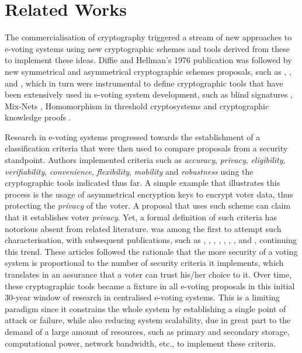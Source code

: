 \documentclass[../main.tex]{subfiles}
\begin{document}
\section{Related Works}
\label{sec:related_works}
The commercialisation of cryptography triggered a stream of new approaches to e-voting systems using new cryptographic schemes and tools derived from these to implement these ideas. Diffie and Hellman's 1976 publication \cite{Diffie1976} was followed by new symmetrical and asymmetrical cryptographic schemes proposals, such as \cite{Chaum1981}, \cite{ElGamal1984}, and \cite{Rivest1983}, which in turn were instrumental to define cryptographic tools that have been extensively used in e-voting system development, such as blind signatures \cite{Chaum1983}, Mix-Nets \cite{Chaum1988}, Homomorphism in threshold cryptosystems \cite{Shamir1979} and cryptographic knowledge proofs \cite{Goldwasser1986}.
\par
Research in e-voting systems progressed towards the establishment of a classification criteria that were then used to compare proposals from a security standpoint. Authors implemented criteria such as \textit{accuracy}, \textit{privacy}, \textit{eligibility}, \textit{verifiability}, \textit{convenience}, \textit{flexibility}, \textit{mobility} and \textit{robustness} using the cryptographic tools indicated thus far. A simple example that illustrates this process is the usage of asymmetrical encryption keys to encrypt voter data, thus protecting the \textit{privacy} of the voter. A proposal that uses such scheme can claim that it establishes voter \textit{privacy}. Yet, a formal definition of such criteria has notorious absent from related literature. \cite{Neumann1993} was among the first to attempt such characterisation, with subsequent publications, such as \cite{Fujioka1992}, \cite{Baraani1995}, \cite{Juang1997}, \cite{Ku1999}, \cite{Lee2000}, \cite{Joaquim2003}, \cite{Baiardi2005}, and \cite{Chaum2007}, continuing this trend. These articles followed the rationale that the more security of a voting system is proportional to the number of security criteria it implements, which translates in an assurance that a voter can trust his/her choice to it. Over time, these cryptographic tools became a fixture in all e-voting proposals in this initial 30-year window of research in centralised e-voting systems. This is a limiting paradigm since it constrains the whole system by establishing a single point of attack or failure, while also reducing system scalability, due in great part to the demand of a large amount of resources, such as primary and secondary storage, computational power, network bandwidth, etc., to implement these criteria.
\end{document}
